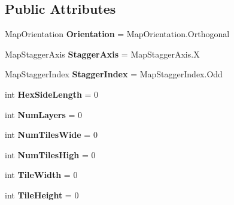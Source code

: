 \subsection*{Public Attributes}
\begin{DoxyCompactItemize}
\item 
\mbox{\label{class_tiled2_unity_1_1_tiled_map_a82a481deedf123c6ce6c9c6fc171cb12}} 
Map\+Orientation {\bfseries Orientation} = Map\+Orientation.\+Orthogonal
\item 
\mbox{\label{class_tiled2_unity_1_1_tiled_map_a09b071640cf98506103a5f08c296ab39}} 
Map\+Stagger\+Axis {\bfseries Stagger\+Axis} = Map\+Stagger\+Axis.\+X
\item 
\mbox{\label{class_tiled2_unity_1_1_tiled_map_a808ab5ae9df00c2c93e14459f021c944}} 
Map\+Stagger\+Index {\bfseries Stagger\+Index} = Map\+Stagger\+Index.\+Odd
\item 
\mbox{\label{class_tiled2_unity_1_1_tiled_map_a4a8a2c09936e8741dea8aa07c809b469}} 
int {\bfseries Hex\+Side\+Length} = 0
\item 
\mbox{\label{class_tiled2_unity_1_1_tiled_map_a806b2071a7144933a803a23e15810e21}} 
int {\bfseries Num\+Layers} = 0
\item 
\mbox{\label{class_tiled2_unity_1_1_tiled_map_a4751f960675fce0b710bfeb8a364278c}} 
int {\bfseries Num\+Tiles\+Wide} = 0
\item 
\mbox{\label{class_tiled2_unity_1_1_tiled_map_afb22dd4537a08cf3325bf5eafe0d14d1}} 
int {\bfseries Num\+Tiles\+High} = 0
\item 
\mbox{\label{class_tiled2_unity_1_1_tiled_map_a41427ef6894ce19eed5d5fc3429eb9e0}} 
int {\bfseries Tile\+Width} = 0
\item 
\mbox{\label{class_tiled2_unity_1_1_tiled_map_a4efa3016fa647fbef3ad703377b00e13}} 
int {\bfseries Tile\+Height} = 0
\item 

\end{DoxyCompactItemize}
